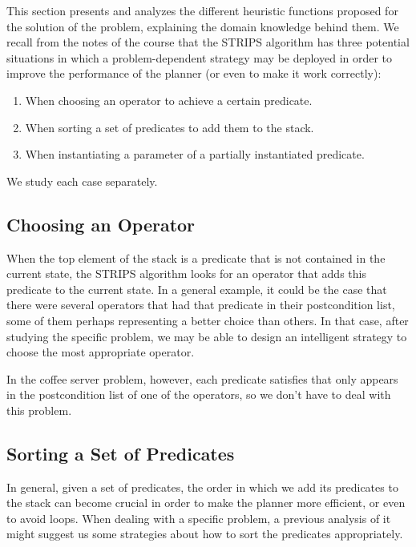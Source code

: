 \documentclass[12pt,a4paper,oneside]{article}
\numberwithin{equation}{section}
\numberwithin{equation}{section}
\theoremstyle{definition}
\begin{document}
This section presents and analyzes the different heuristic functions proposed for the solution of the problem, explaining the domain knowledge behind them. We recall from the notes of the course\cite{notes} that the STRIPS algorithm has three potential situations in which a problem-dependent strategy may be deployed in order to improve the performance of the planner (or even to make it work correctly):
\begin{enumerate}
	\item When choosing an operator to achieve a certain predicate.
	\item When sorting a set of predicates to add them to the stack.
	\item When instantiating a parameter of a partially instantiated predicate.
\end{enumerate}
We study each case separately.

\subsection{Choosing an Operator} \label{Choosing an Operator}

When the top element of the stack is a predicate that is not contained in the current state, the STRIPS algorithm looks for an operator that adds this predicate to the current state. In a general example, it could be the case that there were several operators that had that predicate in their postcondition list, some of them perhaps representing a better choice than others. In that case, after studying the specific problem, we may be able to design an intelligent strategy to choose the most appropriate operator. 


In the coffee server problem, however, each predicate satisfies that only appears in the postcondition list of one of the operators, so we don’t have to deal with this problem.

\subsection{Sorting a Set of Predicates} \label{Sorting a Set of Predicates}

In general, given a set of predicates, the order in which we add its predicates to the stack can become crucial in order to make the planner more efficient, or even to avoid loops. When dealing with a specific problem, a previous analysis of it might suggest us some strategies about how to sort the predicates appropriately.
\end{document}
